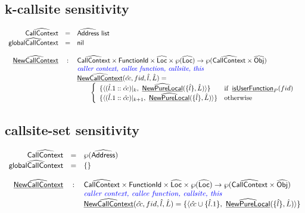 \subsection{k-callsite sensitivity}
\[
\begin{array}{rcl}
\widehat{\mbox{\textsf{CallContext}}} & = & \widehat{\mbox{\textsf{Address}}} \ \mbox{\textsf{list}} \\
\widehat{\mbox{\textsf{globalCallContext}}} & = & \mbox{\textsf{nil}} \\
\\

\widehat{\underline{\sf NewCallContext}} & : & \widehat{\mbox{\textsf{CallContext}}} \times \mbox{\textsf{FunctionId}} \times \widehat{\mbox{\textsf{Loc}}} \times \wp(\widehat{\mbox{\textsf{Loc}}}) \rightarrow \wp(\widehat{\mbox{\textsf{CallContext}}} \times \widehat{\mbox{\textsf{Obj}}}) \\
& & \textit{\color{blue}caller context, callee function, callsite, this}  \\
& & \widehat{\underline{\sf NewCallContext}}(\hat{cc}, fid, \hat{l}, \hat{L}) = \\
& & \quad\quad \left\{
       \begin{array}{ll}
         \{ \langle (\hat{l}.1 :: \hat{cc})|_{k}, ~ \widehat{\underline{\sf NewPureLocal}}(\{\hat{l}\}, \hat{L}) \rangle \} & {\rm if}\begin{array}[t]{l}\underline{\sf isUserFunction}_P(fid)\end{array} \\
         \{ \langle (\hat{l}.1 :: \hat{cc})|_{k+1}, ~ \widehat{\underline{\sf NewPureLocal}}(\{\hat{l}\}, \hat{L}) \rangle \} & {\rm otherwise} \\
       \end{array}
     \right.\\
\end{array}
\]


\subsection{callsite-set sensitivity}
\[
\begin{array}{rcl}
\widehat{\mbox{\textsf{CallContext}}} & = & \wp(\widehat{\mbox{\textsf{Address}}}) \\
\widehat{\mbox{\textsf{globalCallContext}}} & = & \left\{\begin{array}{l} \end{array}\right\} \\
\\

\widehat{\underline{\sf NewCallContext}} & : & \widehat{\mbox{\textsf{CallContext}}} \times \mbox{\textsf{FunctionId}} \times \widehat{\mbox{\textsf{Loc}}} \times \wp(\widehat{\mbox{\textsf{Loc}}}) \rightarrow \wp(\widehat{\mbox{\textsf{CallContext}}} \times \widehat{\mbox{\textsf{Obj}}}) \\
& & \textit{\color{blue}caller context, callee function, callsite, this}  \\
& & \widehat{\underline{\sf NewCallContext}}(\hat{cc}, fid, \hat{l}, \hat{L}) = \{ \langle \hat{cc} \cup \{ \hat{l}.1 \}, ~ \widehat{\underline{\sf NewPureLocal}}(\{\hat{l}\}, \hat{L}) \rangle \} \\
\end{array}
\]


